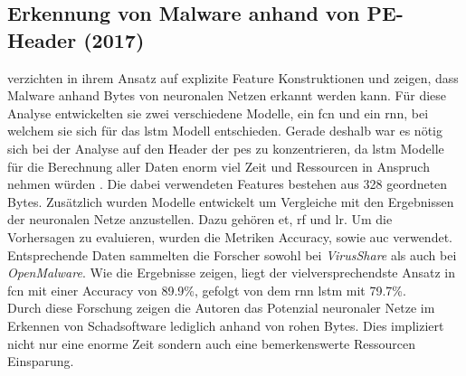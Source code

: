 \documentclass[
    12pt, %
    DIV10,
    ngerman, %
    a4paper, %
    oneside, %
    titlepage, %
    parskip=half, %
    headings=normal, %
    listof=totoc, %
    bibliography=totoc, %
    index=totoc, %
    captions=tableheading, %
    final %
]{scrreprt}
\begin{document}
\subsection{Erkennung von Malware anhand von PE-Header (2017)}
\textcite{Raff2017} verzichten in ihrem Ansatz auf explizite Feature Konstruktionen und zeigen, dass Malware anhand Bytes von neuronalen Netzen erkannt werden kann. 
Für diese Analyse entwickelten sie zwei verschiedene Modelle, ein \ac{fcn} und ein \ac{rnn}, bei welchem sie sich für das \ac{lstm} Modell entschieden. Gerade deshalb war es nötig sich bei der Analyse auf den Header der \ac{pes} zu konzentrieren, da \ac{lstm} Modelle für die Berechnung aller Daten enorm viel Zeit und Ressourcen in Anspruch nehmen würden \parencite{Raff2017}. Die dabei verwendeten Features bestehen aus 328 geordneten Bytes.
Zusätzlich wurden Modelle entwickelt um Vergleiche mit den Ergebnissen der neuronalen Netze anzustellen. Dazu gehören \ac{et}, \ac{rf} und \ac{lr}. Um die Vorhersagen zu evaluieren, wurden die Metriken Accuracy, sowie \ac{auc} verwendet. Entsprechende Daten sammelten die Forscher sowohl bei \emph{VirusShare} als auch bei \emph{OpenMalware}. Wie die Ergebnisse zeigen, liegt der vielversprechendste Ansatz in \ac{fcn} mit einer Accuracy von 89.9\%, gefolgt von dem \ac{rnn} \ac{lstm} mit 79.7\%.\\
Durch diese Forschung zeigen die Autoren das Potenzial neuronaler Netze im Erkennen von Schadsoftware lediglich anhand von rohen Bytes. Dies impliziert nicht nur eine enorme Zeit sondern auch eine bemerkenswerte Ressourcen Einsparung.
%
\end{document}
